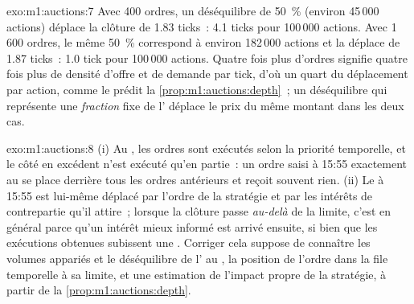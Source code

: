 \begin{solution}{exo:m1:auctions:7}
Avec 400 ordres, un déséquilibre de 50~\% (environ 45\,000 actions) déplace la clôture
de 1.83 ticks~: 4.1 ticks pour 100\,000 actions. Avec 1\,600 ordres, le même
50~\% correspond à environ 182\,000 actions et la déplace de 1.87 ticks~: 1.0 tick pour 100\,000
actions. Quatre fois plus d'ordres signifie quatre fois plus de densité d'offre et de
demande par tick, d'où un quart du déplacement par action, comme le
prédit la \cref{prop:m1:auctions:depth}~; un déséquilibre qui représente une
\emph{fraction} fixe de l' déplace le prix du même montant dans les deux cas.
\end{solution}

\begin{solution}{exo:m1:auctions:8}
(i) Au , les ordres sont exécutés selon la priorité temporelle, et le
côté en excédent n'est exécuté qu'en partie~: un ordre saisi à 15:55 exactement au
 se place derrière tous les ordres antérieurs et reçoit souvent rien. (ii) Le
 à 15:55 est lui-même déplacé par l'ordre de la stratégie et par les
intérêts de contrepartie qu'il attire~; lorsque la clôture passe \emph{au-delà}
de la limite, c'est en général parce qu'un intérêt mieux informé est arrivé ensuite,
si bien que les exécutions obtenues subissent une . Corriger cela suppose de connaître les
volumes appariés et le déséquilibre de l' au , la position de l'ordre
dans la file temporelle à sa limite, et une estimation de l'impact propre de la
stratégie, à partir de la \cref{prop:m1:auctions:depth}.
\end{solution}

